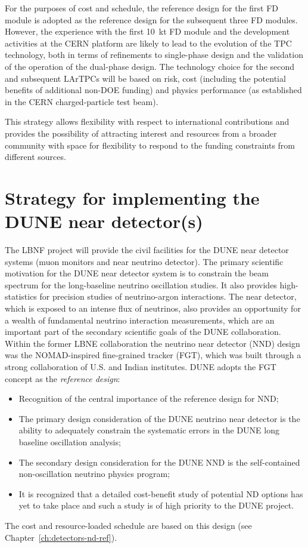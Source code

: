 For the purposes of cost and schedule, the reference design for the
first FD module is adopted as the reference design for the subsequent
three FD modules. However, the experience with the first 10~kt FD
module and the development activities at the CERN platform are likely
to lead to the evolution of the TPC technology, both in terms of
refinements to single-phase design and the validation of the operation
of the dual-phase design.  The technology choice for the second and
subsequent LArTPCs will be based on risk, cost (including the
potential benefits of additional non-DOE funding) and physics
performance (as established in the CERN charged-particle test beam).

This strategy allows flexibility with respect to international
contributions and provides the possibility of attracting interest and
resources from a broader community with space for flexibility to
respond to the funding constraints from different sources.

\section{Strategy for implementing the DUNE near detector(s)}

The LBNF project will provide the civil facilities for the DUNE near
detector systems (muon monitors and near neutrino detector). The
primary scientific motivation for the DUNE near detector system is to
constrain the beam spectrum for the long-baseline neutrino oscillation
studies. It also provides high-statistics for precision studies of
neutrino-argon interactions. The near detector, which is exposed to an
intense flux of neutrinos, also provides an opportunity for a wealth
of fundamental neutrino interaction measurements, which are an
important part of the secondary scientific goals of the DUNE
collaboration. Within the former LBNE collaboration the neutrino near
detector (NND) design was the NOMAD-inspired fine-grained tracker
(FGT), which was built through a strong collaboration of U.S. and
Indian institutes. DUNE adopts the FGT concept as the
\textit{reference design}:
\begin{itemize}
\item Recognition of the central importance of the reference design for NND;
\item The primary design consideration of the DUNE neutrino near
  detector is the ability to adequately constrain the systematic
  errors in the DUNE long baseline oscillation analysis;
\item The secondary design consideration for the DUNE NND is the
  self-contained non-oscillation neutrino physics program;
\item It is recognized that a detailed cost-benefit study of potential
  ND options has yet to take place and such a study is of high
  priority to the DUNE project.
\end{itemize}
The cost and resource-loaded schedule are based on this design (see
Chapter~\ref{ch:detectors-nd-ref}).


